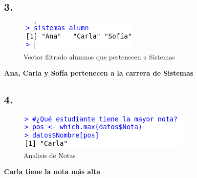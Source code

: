 \documentclass{article}
\begin{document}
\subsection*{3.}
\begin{figure}[H]
    \centering
    \includegraphics[width=1\linewidth]{Captura desde 2025-10-07 19-26-09.png}
    \caption{Vector filtrado alumnos que pertenecen a Sistemas}
    \label{fig:placeholder}
\end{figure}
\textbf{Ana, Carla y Sofía pertenecen a la carrera de Sistemas}

\subsection*{4.}
\begin{figure}[H]
    \centering
    \includegraphics[width=1\linewidth]{Captura desde 2025-10-07 19-30-14.png}
    \caption{Analisis de Notas}
    \label{fig:placeholder}
\end{figure}
\textbf{Carla tiene la nota más alta}
\end{document}
